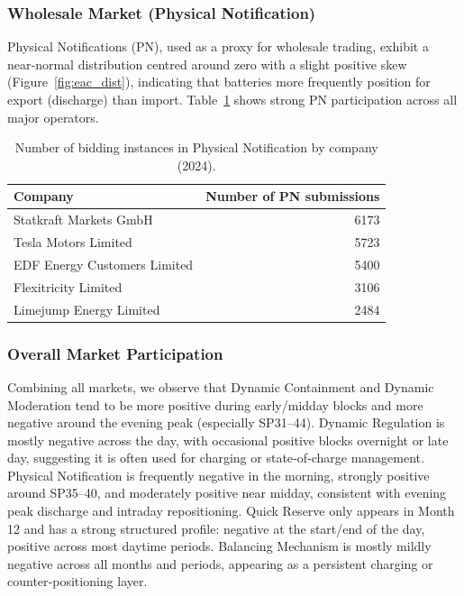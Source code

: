 \documentclass[12pt,a4paper]{article}
\begin{document}
\subsubsection{Wholesale Market (Physical Notification)}
Physical Notifications (PN), used as a proxy for wholesale trading, exhibit a near‑normal distribution centred around zero with a slight positive skew (Figure~\ref{fig:eac_dist}), indicating that batteries more frequently position for export (discharge) than import. Table~\ref{tab:pn_counts} shows strong PN participation across all major operators.

\begin{table}[H]
\centering
\caption{Number of bidding instances in Physical Notification by company (2024).}
\label{tab:pn_counts}
\begin{tabular}{@{}lr@{}}
\toprule
Company & Number of PN submissions \\
\midrule
Statkraft Markets GmbH & 6173 \\
Tesla Motors Limited & 5723 \\
EDF Energy Customers Limited & 5400 \\
Flexitricity Limited & 3106 \\
Limejump Energy Limited & 2484 \\
\bottomrule
\end{tabular}
\end{table}



\subsubsection{Overall Market Participation}
Combining all markets, we observe that Dynamic Containment and Dynamic Moderation tend to be more positive during early/midday blocks and more negative around the evening peak (especially SP31--44). Dynamic Regulation is mostly negative across the day, with occasional positive blocks overnight or late day, suggesting it is often used for charging or state‑of‑charge management. Physical Notification is frequently negative in the morning, strongly positive around SP35--40, and moderately positive near midday, consistent with evening peak discharge and intraday repositioning. Quick Reserve only appears in Month 12 and has a strong structured profile: negative at the start/end of the day, positive across most daytime periods. Balancing Mechanism is mostly mildly negative across all months and periods, appearing as a persistent charging or counter‑positioning layer.
\end{document}
